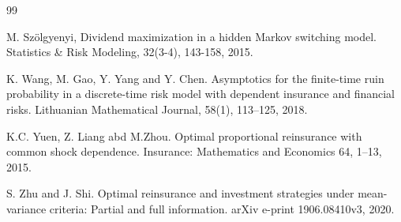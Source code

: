 \documentclass[reqno, 11pt]{amsart}%
\theoremstyle{definition}
\numberwithin{equation}{section} \numberwithin{theorem}{section}
\begin{document}
\begin{thebibliography}{99}

 M. Sz\"olgyenyi, Dividend maximization in a hidden Markov switching model. Statistics \& Risk Modeling, 32(3-4), 143-158, 2015.

 K. Wang, M. Gao, Y. Yang and Y. Chen. Asymptotics for the finite-time ruin probability in a discrete-time risk model with dependent insurance and financial risks. Lithuanian Mathematical Journal, 58(1), 113--125, 2018.


 K.C. Yuen, Z. Liang abd M.Zhou. Optimal proportional reinsurance with common shock dependence. Insurance: Mathematics and Economics 64, 1--13, 2015.



S. Zhu and J. Shi. Optimal reinsurance and investment strategies under mean-variance criteria: Partial and full information. arXiv e-print 1906.08410v3, 2020.



\end{thebibliography}
\end{document}
